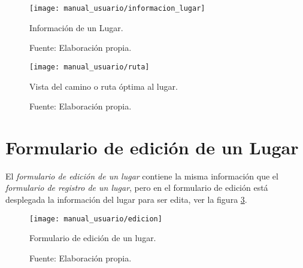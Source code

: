\begin{figure}[H]
      \begin{center}
        \texttt{[image: manual\_usuario/informacion\_lugar]}

        \caption{Información de un Lugar.}
        \label{fig:vista_información_lugar}
        \caption*{Fuente: Elaboración propia.}
      \end{center}
\end{figure}


\begin{figure}[H]
      \begin{center}
        \texttt{[image: manual\_usuario/ruta]}

        \caption{Vista del camino o ruta óptima al lugar.}
        \label{fig:vista_ruta}
        \caption*{Fuente: Elaboración propia.}
      \end{center}
\end{figure}


%
%


\section{Formulario de edición de un Lugar}

El \emph{formulario de edición de un lugar} contiene la misma información que el \emph{formulario de registro de un lugar}, pero en el formulario de edición está desplegada la información del lugar para ser edita, ver la figura \ref{fig:vista_edicion_lugar}.

\begin{figure}[H]
      \begin{center}
        \texttt{[image: manual\_usuario/edicion]}

        \caption{Formulario de edición de un lugar.}
        \label{fig:vista_edicion_lugar}
        \caption*{Fuente: Elaboración propia.}
      \end{center}
\end{figure}



